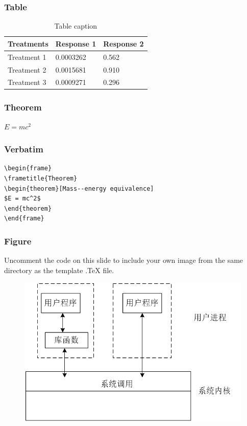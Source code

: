 \documentclass{beamer}
\begin{document}
\begin{frame}
\frametitle{Table}
\begin{table}
\begin{tabular}{l l l}
\toprule
\textbf{Treatments} & \textbf{Response 1} & \textbf{Response 2}\\
\midrule
Treatment 1 & 0.0003262 & 0.562 \\
Treatment 2 & 0.0015681 & 0.910 \\
Treatment 3 & 0.0009271 & 0.296 \\
\bottomrule
\end{tabular}
\caption{Table caption}
\end{table}
\end{frame}


\begin{frame}
\frametitle{Theorem}
\begin{theorem}
$E = mc^2$
\end{theorem}
\end{frame}


\begin{frame}[fragile] %
\frametitle{Verbatim}
\begin{example}
\begin{verbatim}
\begin{frame}
\frametitle{Theorem}
\begin{theorem}[Mass--energy equivalence]
$E = mc^2$
\end{theorem}
\end{frame}\end{verbatim}
\end{example}
\end{frame}


\begin{frame}
\frametitle{Figure}
Uncomment the code on this slide to include your own image from the same directory as the template .TeX file.
\begin{figure}
\includegraphics[width=0.8\linewidth]{601}
\end{figure}
\end{frame}
\end{document}
